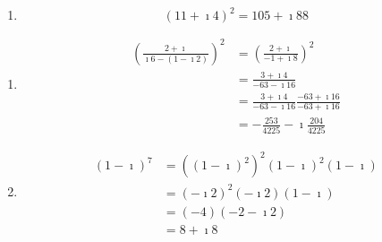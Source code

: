 {\begin{Solution}
\begin{enumerate}
    Now we do the multiplication in modulus-argument, (polar), form.
    \begin{align*}
      \left( 1 + \imath \sqrt{3} \right)^{-10}
      &= \left( 2 \e^{\imath \pi / 3} \right)^{-10} 
      \\
      &= 2^{-10} \e^{- \imath 10 \pi / 3} 
      \\
      &= \frac{1}{1024} \left( \cos \left( - \frac{10 \pi}{3} \right)
        + \imath \sin \left( - \frac{10 \pi}{3} \right) \right) 
      \\
      &= \frac{1}{1024} \left( \cos \left( \frac{4 \pi}{3} \right)
        - \imath \sin \left( \frac{4 \pi}{3} \right) \right) 
      \\
      &= \frac{1}{1024} \left( - \frac{1}{2} + \imath \frac{\sqrt{3}}{2} \right)
      \\
      &= - \frac{1}{2048} + \imath \frac{\sqrt{3}}{2048}
    \end{align*}
  \item
    \[
    (11 + \imath 4)^2 = 105 + \imath 88
    \]
  \end{enumerate}
\end{Solution}




\begin{Solution}
  \label{solution (1 - i)7}
  \begin{enumerate}
  \item
    \begin{align*}
      \left( \frac{2 + \imath}{\imath 6 -(1 - \imath 2)} \right)^2
      &= \left( \frac{2 + \imath}{- 1 + \imath 8} \right)^2 
      \\
      &= \frac{3 + \imath 4}{- 63 - \imath 16} 
      \\
      &= \frac{3 + \imath 4}{- 63 - \imath 16}  \frac{- 63 + \imath 16}{- 63 + \imath 16} 
      \\
      &= - \frac{253}{4225} - \imath \frac{204}{4225}
    \end{align*}
  \item
    \begin{align*}
      (1 - \imath)^7
      &= \left( (1 - \imath)^{2} \right)^2  (1 - \imath)^2  (1 - \imath) 
      \\
      &= (- \imath 2)^2  (- \imath 2)  (1 - \imath) 
      \\
      &= (- 4)  (- 2 - \imath 2) 
      \\
      &= 8 + \imath 8
    \end{align*}
  \end{enumerate}
\end{Solution}














}
